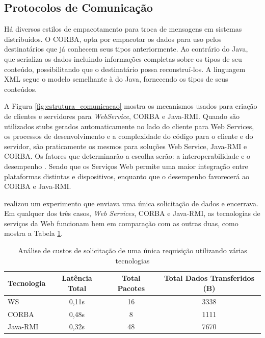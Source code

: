 \documentclass[
	12pt,				%
	oneside,			%
	a4paper,			%
	english,			%
	brazil				%
	]{abntex2ppgsi}
\begin{document}
\subsection{Protocolos de Comunicação}

Há diversos estilos de empacotamento para troca de mensagens em sistemas distribuídos. O CORBA, opta por empacotar os dados para uso pelos destinatários que já conhecem seus tipos anteriormente. Ao contrário do Java, que serializa os dados incluindo informações completas sobre os tipos de seu conteúdo, possibilitando que o destinatário possa reconstruí-los. A linguagem XML segue o modelo semelhante à do Java, fornecendo os tipos de seus conteúdos. 

A Figura \ref{fig:estrutura_comunicacao} mostra os mecanismos usados para criação de clientes e servidores para \textit{WebService}, CORBA e Java-RMI. Quando são utilizados stubs gerados automaticamente no lado do cliente para Web Services, os processos de desenvolvimento e a complexidade do código para o cliente e do servidor, são praticamente os mesmos para soluções Web Service, Java-RMI e CORBA. Os fatores que determinarão a escolha serão: a interoperabilidade e o desempenho \cite{gray2004comparison}. Sendo que os Serviços Web permite uma maior integração entre plataformas distintas e dispositivos, enquanto que o desempenho favorecerá ao CORBA e Java-RMI. 

 realizou um experimento que enviava uma única solicitação de dados e encerrava. Em qualquer dos três casos, \textit{Web Services}, CORBA e Java-RMI, as tecnologias de serviços da Web funcionam bem em comparação com as outras duas, como mostra a Tabela \ref{tbComparacaoWS_CORBA_RMI}.

\begin{table}[h!]
	\centering
	\caption{Análise de custos de solicitação de uma única requisição utilizando várias tecnologias\cite{gray2004comparison}}
	\label{tbComparacaoWS_CORBA_RMI}
	\begin{tabular}{|l | c|c|c|}
		\hline
		\rowcolor[gray]{0.7}
		Tecnologia & Latência Total  & Total Pacotes  & Total Dados Transferidos (B)  \\ \hline
		WS              & 0,11s & 16 & 3338  \\ \hline
		CORBA        & 0,48s & 8 & 1111  \\ \hline
		Java-RMI     & 0,32s & 48 & 7670  \\ \hline
	\end{tabular}
\end{table}
\end{document}
